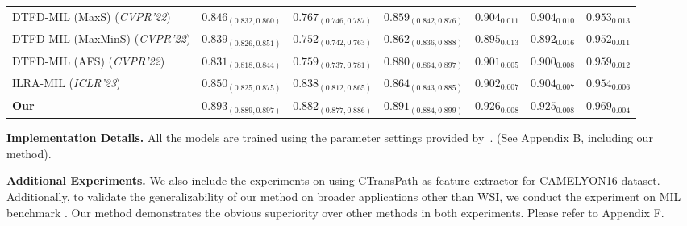 \documentclass[runningheads]{llncs}
\begin{document}
\begin{table}[t]
{\begin{tabular}{lccc|ccc}
                    DTFD-MIL (MaxS) (\textit{CVPR'22}) & $0.846_{(0.832,0.860)}$& $0.767_{(0.746,0.787)}$ & $0.859_{(0.842,0.876)}$ &$0.904_{0.011}$ & $0.904_{0.010}$ & $0.953_{0.013}$
                    \\
                    DTFD-MIL (MaxMinS) (\textit{CVPR'22})  &$0.839_{(0.826,0.851)}$ & $0.752_{(0.742,0.763)}$ & $0.862_{(0.836,0.888)}$ & $0.895_{0.013}$ & $0.892_{0.016}$ & $0.952_{0.011}$ \\ %
                    DTFD-MIL (AFS) (\textit{CVPR'22})  & $0.831_{(0.818,0.844)}$ & $0.759_{(0.737,0.781)}$ & $0.880_{(0.864,0.897)}$ & $0.901_{0.005}$ & $0.900_{0.008}$ & $0.959_{0.012}$
                    \\%
                    ILRA-MIL (\textit{ICLR'23})  &$0.850
_{(0.825
,0.875)}$& $0.838
_{(0.812
,0.865
)}$ & $0.864
_{(0.843
,0.885
)} $ & $0.902_{0.007}$ &$0.904_{0.007}$ &$0.954_{0.006}$  
        
                     
                     \\
                     \rowcolor{blue!8}
                     \textbf{Our}  
                    & $\mathbf{0.893}_{(0.889,0.897)}$ & $\mathbf{0.882}_{(0.877,0.886)}$ & $\mathbf{0.891}_{(0.884,0.899)}$ & $\mathbf{0.926}_{0.008}$ & $\mathbf{0.925}_{0.008}$ & $\mathbf{0.969}_{0.004}$

                     
                     \\ 
                     
				\bottomrule
 			\end{tabular}}

   \vspace{-0.5cm}
\end{table}
\noindent\textbf{Implementation Details.}  All the models are trained using the parameter settings provided by~\cite{shao2021transmil,zhang2022dtfd,li2021dual,clam-sb,lowrankmil}. (See Appendix B, including our method). 


\noindent\textbf{Additional Experiments.} We also include the experiments on using CTransPath \cite{wang2022transformer} as feature extractor for CAMELYON16 dataset. Additionally, to validate the generalizability of our method on broader applications other than WSI, we conduct the experiment on MIL benchmark \cite{dietterich1997solving,andrews2002support}. Our method demonstrates the obvious superiority over other methods in both experiments. Please refer to Appendix F.
\end{document}
